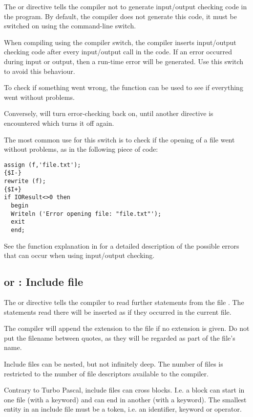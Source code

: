 The  or  directive tells the compiler
not to generate input/output checking code in the program. By default, the
compiler does not generate this code, it must be switched on using the 
command-line switch.

When compiling using the  compiler switch, the \fpc compiler inserts
input/output checking code after every input/output call in the code.
If an error occurred during input or output, then a run-time error will
be generated. Use this switch to avoid this behaviour.

To check if something went wrong, the  function can be used
to see if everything went without problems.

Conversely,  will turn error-checking back on, until another
directive is encountered which turns it off again.

The most common use for this switch is to check if the opening of a file
went without problems, as in the following piece of code:
\begin{verbatim}
assign (f,'file.txt');
{$I-}
rewrite (f);
{$I+}
if IOResult<>0 then
  begin
  Writeln ('Error opening file: "file.txt"');
  exit
  end;
\end{verbatim}
See the  function explanation in  for a
detailed description of the possible errors that can occur when using
input/output checking.

\subsection{ or  : Include file }

The  or  directive
tells the compiler to read further statements from the file .
The statements read there will be inserted as if they occurred in the
current file.

The compiler will append the  extension to the file if no
extension is given. Do not put the filename between quotes, as
they will be regarded as part of the file's name.

Include files can be nested, but not infinitely deep. The number of files is
restricted to the number of file descriptors available to the \fpc compiler.

Contrary to Turbo Pascal, include files can cross blocks. I.e. 
a block can start in one file (with a  keyword) and can end in another (with
a  keyword). The smallest entity in an include file must be a token,
i.e. an identifier, keyword or operator.

